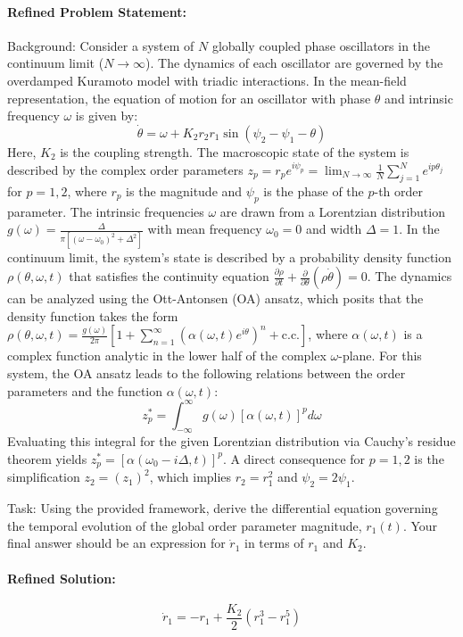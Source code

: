\documentclass[10pt]{article}
\begin{document}
\paragraph*{Refined Problem Statement:}
Background:
Consider a system of $N$ globally coupled phase oscillators in the continuum limit ($N \to \infty$). The dynamics of each oscillator are governed by the overdamped Kuramoto model with triadic interactions. In the mean-field representation, the equation of motion for an oscillator with phase $\theta$ and intrinsic frequency $\omega$ is given by:
$$ \dot{\theta} = \omega + K_2 r_2 r_1 \sin(\psi_2 - \psi_1 - \theta) $$
Here, $K_2$ is the coupling strength. The macroscopic state of the system is described by the complex order parameters $z_p = r_p e^{i\psi_p} = \lim_{N\to\infty} \frac{1}{N} \sum_{j=1}^N e^{ip\theta_j}$ for $p=1,2$, where $r_p$ is the magnitude and $\psi_p$ is the phase of the $p$-th order parameter. The intrinsic frequencies $\omega$ are drawn from a Lorentzian distribution $g(\omega) = \frac{\Delta}{\pi [ (\omega - \omega_0)^2 + \Delta^2 ]}$ with mean frequency $\omega_0 = 0$ and width $\Delta=1$. In the continuum limit, the system's state is described by a probability density function $\rho(\theta, \omega, t)$ that satisfies the continuity equation $\frac{\partial \rho}{\partial t} + \frac{\partial}{\partial \theta}(\rho \dot{\theta}) = 0$. The dynamics can be analyzed using the Ott-Antonsen (OA) ansatz, which posits that the density function takes the form $\rho(\theta, \omega, t) = \frac{g(\omega)}{2\pi} \left[ 1 + \sum_{n=1}^{\infty} (\alpha(\omega, t) e^{i\theta})^n + \text{c.c.} \right]$, where $\alpha(\omega, t)$ is a complex function analytic in the lower half of the complex $\omega$-plane. For this system, the OA ansatz leads to the following relations between the order parameters and the function $\alpha(\omega, t)$:
$$ z_p^* = \int_{-\infty}^{\infty} g(\omega) [\alpha(\omega, t)]^p d\omega $$
Evaluating this integral for the given Lorentzian distribution via Cauchy's residue theorem yields $z_p^* = [\alpha(\omega_0 - i\Delta, t)]^p$. A direct consequence for $p=1,2$ is the simplification $z_2 = (z_1)^2$, which implies $r_2 = r_1^2$ and $\psi_2 = 2\psi_1$.

Task:
Using the provided framework, derive the differential equation governing the temporal evolution of the global order parameter magnitude, $r_1(t)$. Your final answer should be an expression for $\dot{r}_1$ in terms of $r_1$ and $K_2$.

\paragraph*{Refined Solution:}
\[ \dot{r}_1 = -r_1 + \frac{K_2}{2} (r_1^3 - r_1^5) \]
\end{document}
